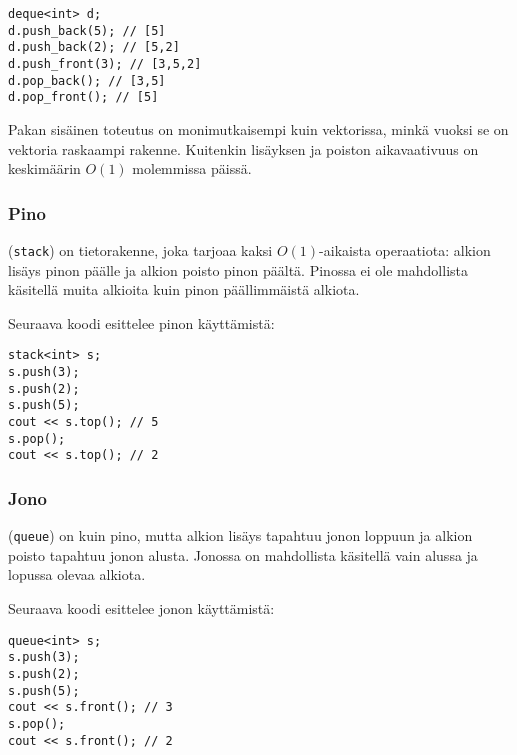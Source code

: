 \begin{lstlisting}
deque<int> d;
d.push_back(5); // [5]
d.push_back(2); // [5,2]
d.push_front(3); // [3,5,2]
d.pop_back(); // [3,5]
d.pop_front(); // [5]
\end{lstlisting}

Pakan sisäinen toteutus on monimutkaisempi kuin
vektorissa, minkä vuoksi se on
vektoria raskaampi rakenne.
Kuitenkin lisäyksen ja poiston
aikavaativuus on keskimäärin $O(1)$ molemmissa päissä.

\subsubsection{Pino}


 (\texttt{stack}) on tietorakenne,
joka tarjoaa kaksi $O(1)$-aikaista
operaatiota:
alkion lisäys pinon päälle ja alkion
poisto pinon päältä.
Pinossa ei ole mahdollista käsitellä muita
alkioita kuin pinon päällimmäistä alkiota.

Seuraava koodi esittelee pinon käyttämistä:

\begin{lstlisting}
stack<int> s;
s.push(3);
s.push(2);
s.push(5);
cout << s.top(); // 5
s.pop();
cout << s.top(); // 2
\end{lstlisting}
\subsubsection{Jono}


 (\texttt{queue}) on kuin pino,
mutta alkion lisäys tapahtuu jonon loppuun
ja alkion poisto tapahtuu jonon alusta.
Jonossa on mahdollista käsitellä vain
alussa ja lopussa olevaa alkiota.

Seuraava koodi esittelee jonon käyttämistä:

\begin{lstlisting}
queue<int> s;
s.push(3);
s.push(2);
s.push(5);
cout << s.front(); // 3
s.pop();
cout << s.front(); // 2
\end{lstlisting}
% 

